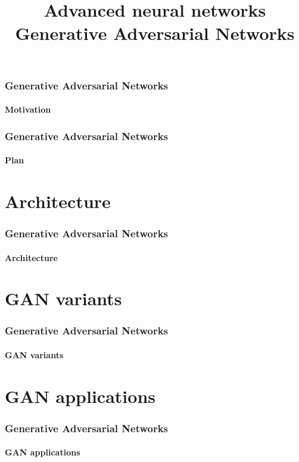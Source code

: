 \documentclass[xcolor=table]{beamer}
\title[ANN: GAN] %
{Advanced neural networks\\Generative Adversarial Networks}
\begin{document}
\begin{frame}
\frametitle{Generative Adversarial Networks}
\framesubtitle{Motivation}


\end{frame}

\begin{frame}
\frametitle{Generative Adversarial Networks}
\framesubtitle{Plan}

\begin{multicols}{2}
	\tableofcontents
\end{multicols}
\end{frame}

\section{Architecture}

\begin{frame}
	\frametitle{Generative Adversarial Networks}
	\framesubtitle{Architecture}
\end{frame}


\section{GAN variants}

\begin{frame}
	\frametitle{Generative Adversarial Networks}
	\framesubtitle{GAN variants}
	
\end{frame}

\section{GAN applications}

\begin{frame}
	\frametitle{Generative Adversarial Networks}
	\framesubtitle{GAN applications}
	
\end{frame}

\end{document}
